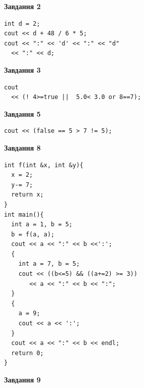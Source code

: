 \documentclass[12pt, ukrainian]{article}
\begin{document}
{\begin {large}
\begin{minipage}[t]{7.0cm}
\end{minipage}
\vline \hspace{1mm}
\begin{minipage}[t]{11.0cm}

\begin{center}
\textbf{Завдання 2}
\end{center}
\vspace{-8mm}

\begin{verbatim}
int d = 2;
cout << d + 48 / 6 * 5;
cout << ":" << 'd' << ":" << "d" 
  << ":" << d;
\end{verbatim}



\begin{center}
\textbf{Завдання 3}
\end{center}
\vspace{-8mm}

\begin{verbatim}
cout 
  << (! 4>=true ||  5.0< 3.0 or 8==7);
\end{verbatim}



\begin{center}
\textbf{Завдання 5}
\end{center}
\vspace{-8mm}

\begin{verbatim}
cout << (false == 5 > 7 != 5);
\end{verbatim}



\begin{center}
\textbf{Завдання 8}
\end{center}
\vspace{-8mm}

\begin{verbatim}
int f(int &x, int &y){
  x = 2;
  y-= 7;
  return x;
}
int main(){
  int a = 1, b = 5;
  b = f(a, a);
  cout << a << ":" << b <<':';
  {
    int a = 7, b = 5;
    cout << ((b<=5) && ((a+=2) >= 3))
       << a << ":" << b << ":";
  }
  {
    a = 9;
    cout << a << ':';
  }
  cout << a << ":" << b << endl;
  return 0;
}
\end{verbatim}

\end{minipage}


\begin{minipage}[t]{7.0cm}

\begin{center}
\textbf{Завдання 9}
\end{center}
\vspace{-8mm}


\end{minipage}
\end{large}}
\end{document}
